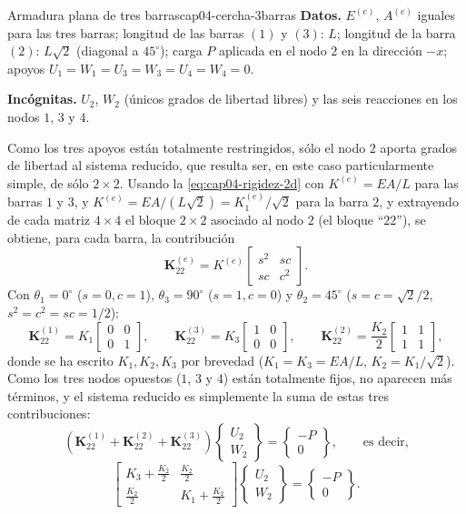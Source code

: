 \begin{ejemplo}{Armadura plana de tres barras}{cap04-cercha-3barras}
\textbf{Datos.} $E^{(e)}$, $A^{(e)}$ iguales para las tres barras; longitud de las barras $(1)$ y $(3)$: $L$; longitud de la barra $(2)$: $L\sqrt2$ (diagonal a $45^\circ$); carga $P$ aplicada en el nodo $2$ en la dirección $-x$; apoyos $U_1=W_1=U_3=W_3=U_4=W_4=0$.

\textbf{Incógnitas.} $U_2$, $W_2$ (únicos grados de libertad libres) y las seis reacciones en los nodos $1$, $3$ y $4$.

Como los tres apoyos están totalmente restringidos, sólo el nodo $2$ aporta grados de libertad al sistema reducido, que resulta ser, en este caso particularmente simple, de sólo $2\times2$. Usando la \cref{eq:cap04-rigidez-2d} con $K^{(e)}=EA/L$ para las barras $1$ y $3$, y $K^{(e)}=EA/(L\sqrt2)=K^{(e)}_{1}/\sqrt2$ para la barra $2$, y extrayendo de cada matriz $4\times4$ el bloque $2\times2$ asociado al nodo $2$ (el bloque ``$22$''), se obtiene, para cada barra, la contribución
\[
\mathbf{K}_{22}^{(e)} = K^{(e)}\begin{bmatrix} s^2 & sc \\ sc & c^2 \end{bmatrix} .
\]
Con $\theta_1=0^\circ$ ($s=0,c=1$), $\theta_3=90^\circ$ ($s=1,c=0$) y $\theta_2=45^\circ$ ($s=c=\sqrt2/2$, $s^2=c^2=sc=1/2$):
\[
\mathbf{K}_{22}^{(1)} = K_1\begin{bmatrix}0&0\\0&1\end{bmatrix}, \qquad
\mathbf{K}_{22}^{(3)} = K_3\begin{bmatrix}1&0\\0&0\end{bmatrix}, \qquad
\mathbf{K}_{22}^{(2)} = \frac{K_2}{2}\begin{bmatrix}1&1\\1&1\end{bmatrix},
\]
donde se ha escrito $K_1,K_2,K_3$ por brevedad ($K_1=K_3=EA/L$, $K_2=K_1/\sqrt2$). Como los tres nodos opuestos ($1$, $3$ y $4$) están totalmente fijos, no aparecen más términos, y el sistema reducido es simplemente la suma de estas tres contribuciones:
\[
\left(\mathbf{K}_{22}^{(1)}+\mathbf{K}_{22}^{(2)}+\mathbf{K}_{22}^{(3)}\right)\begin{Bmatrix}U_2\\W_2\end{Bmatrix} = \begin{Bmatrix}-P\\0\end{Bmatrix}, \qquad\text{es decir,}
\]
\[
\begin{bmatrix} K_3+\tfrac{K_2}{2} & \tfrac{K_2}{2} \\ \tfrac{K_2}{2} & K_1+\tfrac{K_2}{2} \end{bmatrix}\begin{Bmatrix}U_2\\W_2\end{Bmatrix} = \begin{Bmatrix}-P\\0\end{Bmatrix} .
\]


\end{ejemplo}
